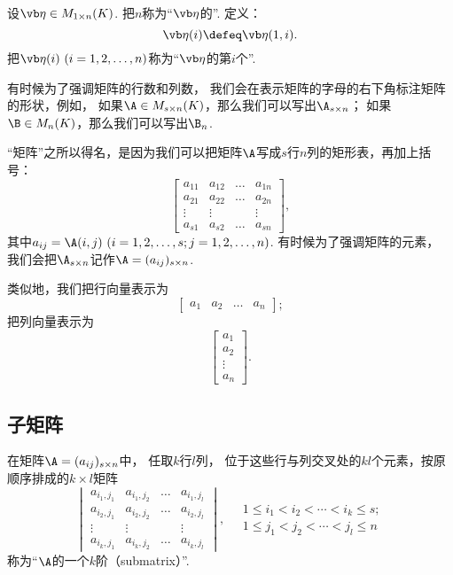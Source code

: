 设\(\b\in M_{1 \times n}(K)\).
把\(n\)称为“\(\b\)的”.
定义：\[
	\b(i) \defeq \b(1,i).
\]
把\(\b(i)\ (i=1,2,\dotsc,n)\)称为“\(\b\)的第\(i\)个”.

有时候为了强调矩阵的行数和列数，
我们会在表示矩阵的字母的右下角标注矩阵的形状，例如，
如果\(\A\in M_{s \times n}(K)\)，那么我们可以写出\(\A_{s \times n}\)；
如果\(\B\in M_n(K)\)，那么我们可以写出\(\B_n\).

“矩阵”之所以得名，是因为我们可以把矩阵\(\A\)写成\(s\)行\(n\)列的矩形表，再加上括号：\[
	\begin{bmatrix}
		a_{11} & a_{12} & \dots & a_{1n} \\
		a_{21} & a_{22} & \dots & a_{2n} \\
		\vdots & \vdots & & \vdots \\
		a_{s1} & a_{s2} & \dots & a_{sn}
	\end{bmatrix},
\]
其中\(a_{ij}=\A(i,j)\ (i=1,2,\dotsc,s;j=1,2,\dotsc,n)\).
有时候为了强调矩阵的元素，
我们会把\(\A_{s \times n}\)记作\(\A=(a_{ij})_{s \times n}\).

类似地，我们把行向量表示为\[
	\begin{bmatrix}
		a_1 & a_2 & \dots & a_n
	\end{bmatrix};
\]
把列向量表示为\[
	\begin{bmatrix}
		a_1 \\ a_2 \\ \vdots \\ a_n
	\end{bmatrix}.
\]

\subsection{子矩阵}
\begin{definition}
在矩阵\(\A=(a_{ij})_{s \times n}\)中，
任取\(k\)行\(l\)列，
位于这些行与列交叉处的\(kl\)个元素，按原顺序排成的\(k \times l\)矩阵\[
	\begin{vmatrix}
		a_{i_1,j_1} & a_{i_1,j_2} & \dots & a_{i_1,j_l} \\
		a_{i_2,j_1} & a_{i_2,j_2} & \dots & a_{i_2,j_l} \\
		\vdots & \vdots & & \vdots \\
		a_{i_k,j_1} & a_{i_k,j_2} & \dots & a_{i_k,j_l}
	\end{vmatrix},
	\quad
	\begin{array}{c}
		1 \leq i_1 < i_2 < \dotsb < i_k \leq s; \\
		1 \leq j_1 < j_2 < \dotsb < j_l \leq n
	\end{array}
\]称为“\(\A\)的一个\(k\)阶（submatrix）”.
\end{definition}

